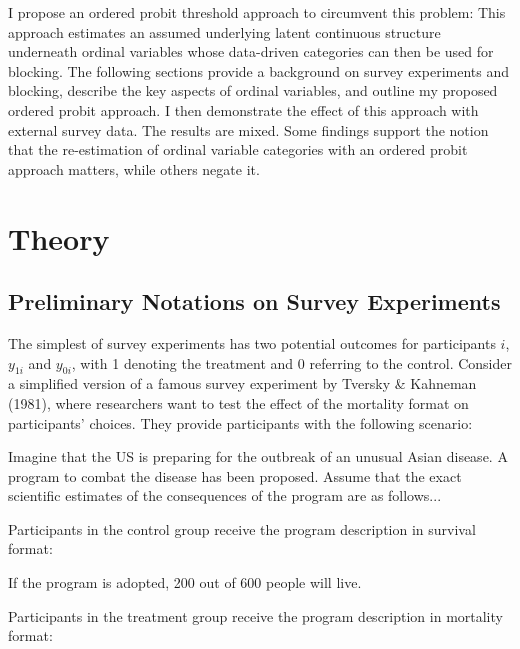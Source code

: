 \documentclass[12pt,econ]{sources/authesis}
\begin{document}
I propose an ordered probit threshold approach to circumvent this problem: This approach estimates an assumed underlying latent continuous structure underneath ordinal variables whose data-driven categories can then be used for blocking. The following sections provide a background on survey experiments and blocking, describe the key aspects of ordinal variables, and outline my proposed ordered probit approach. I then demonstrate the effect of this approach with external survey data. The results are mixed. Some findings support the notion that the re-estimation of ordinal variable categories with an ordered probit approach matters, while others negate it.

\hypertarget{ordblock-theory}{%
\section{Theory}\label{ordblock-theory}}

\hypertarget{ordblock-theory-experiments}{%
\subsection{Preliminary Notations on Survey Experiments}\label{ordblock-theory-experiments}}

The simplest of survey experiments has two potential outcomes for participants \(i\), \(y_{1i}\) and \(y_{0i}\), with 1 denoting the treatment and 0 referring to the control. Consider a simplified version of a famous survey experiment by Tversky \& Kahneman (1981), where researchers want to test the effect of the mortality format on participants' choices.\label{death} They provide participants with the following scenario:

\vspace{0.3cm}
\begin{adjustwidth}{50pt}{50pt}
\ssp
\noindent Imagine that the US is preparing for the outbreak of an unusual Asian disease. A program to combat the disease has been proposed. Assume that the exact scientific estimates of the consequences of the program are as follows...
\end{adjustwidth}
Participants in the control group receive the program description in survival format:

\vspace{0.3cm}
\begin{adjustwidth}{50pt}{50pt}
\ssp
\noindent If the program is adopted, 200 out of 600 people will live.
\end{adjustwidth}
Participants in the treatment group receive the program description in mortality format:
\end{document}
